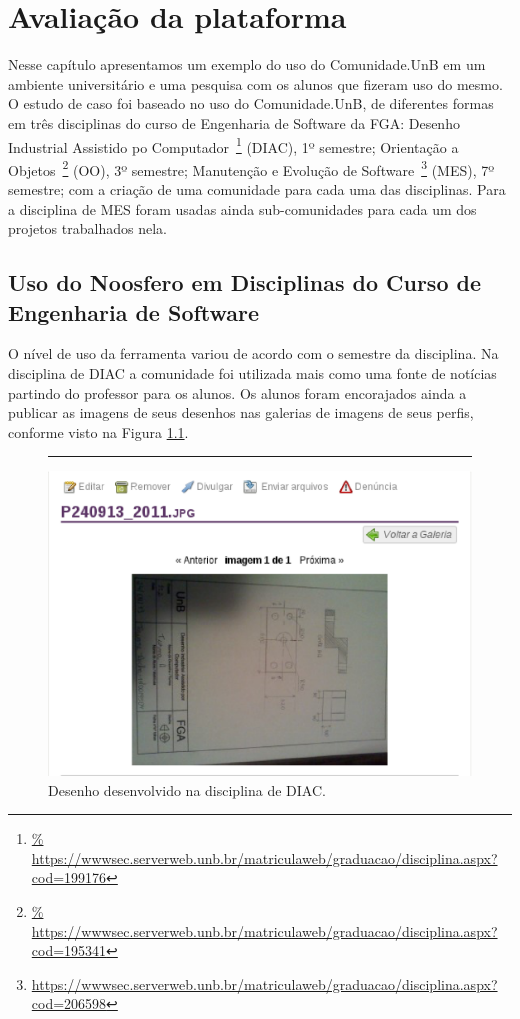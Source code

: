 \chapter{Avaliação da plataforma}

Nesse capítulo apresentamos um exemplo do uso do Comunidade.UnB em um ambiente
universitário e uma pesquisa com os alunos que fizeram uso do mesmo.
%
O estudo de caso foi baseado no uso do Comunidade.UnB, de diferentes formas em
três disciplinas do curso de Engenharia de Software da FGA:
%
Desenho Industrial Assistido po Computador~\footnote{\url{%
https://wwwsec.serverweb.unb.br/matriculaweb/graduacao/disciplina.aspx?cod=199176}} (DIAC), 1º semestre;
%
Orientação a Objetos~\footnote{\url{%
https://wwwsec.serverweb.unb.br/matriculaweb/graduacao/disciplina.aspx?cod=195341}}
(OO), 3º semestre;
%
Manutenção e Evolução de Software~\footnote{\url{
https://wwwsec.serverweb.unb.br/matriculaweb/graduacao/disciplina.aspx?cod=206598}}
(MES), 7º semestre;
%
com a criação de uma comunidade para cada uma das disciplinas. Para a disciplina de
MES foram usadas ainda sub-comunidades para cada um dos projetos trabalhados nela.

\section{Uso do Noosfero em Disciplinas do Curso de Engenharia de Software}
\label{mes-unb}

O nível de uso da ferramenta variou de acordo com o semestre da disciplina. Na
disciplina de DIAC a comunidade foi utilizada mais como uma fonte de notícias
partindo do professor para os alunos. Os alunos foram encorajados ainda a publicar
as imagens de seus desenhos nas galerias de imagens de seus perfis, conforme
visto na Figura \ref{imagem-diac}.

\begin{figure}[h!]
    \centering
		\rule{1cm}{1cm}
    \includegraphics[keepaspectratio=true,scale=0.65]
      {figuras/imagem-diac.eps}
    \caption{Desenho desenvolvido na disciplina de DIAC.}
    \label{imagem-diac}
\end{figure}

